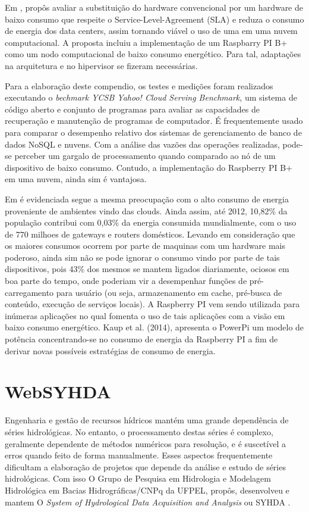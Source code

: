 \documentclass[12pt,english,brazil]{article}
\begin{document}
Em \cite{Joao}, propôs avaliar a substituição do hardware convencional por um hardware de baixo consumo que respeite o Service-Level-Agreement (SLA) e reduza o consumo de energia dos data centers, assim tornando viável o uso de uma em uma nuvem computacional. A proposta incluiu a implementação de um Raspbarry PI B+ como um nodo computacional de baixo consumo energético. Para tal, adaptações na arquitetura e no hipervisor  se fizeram necessárias.

Para a elaboração deste compendio, os testes e medições foram realizados executando o \emph{bechmark YCSB Yahoo! Cloud Serving Benchmark}, um sistema de código aberto e conjunto de programas para avaliar as capacidades de recuperação e manutenção de programas de computador. É frequentemente usado para comparar o desempenho relativo dos sistemas de gerenciamento de banco de dados NoSQL e nuvens. Com a análise das vazões das operações realizadas, pode-se perceber um gargalo de processamento quando comparado ao nó de um dispositivo de baixo consumo. Contudo, a implementação do Raspberry PI B+ em uma nuvem, ainda sim é vantajosa.

Em \cite{PiConsumo} é evidenciada segue a mesma preocupação com o alto consumo de energia proveniente de ambientes vindo das clouds. Ainda assim, até 2012, 10,82\% da população contribui com 0,03\% da energia consumida mundialmente, com o uso de 770 milhoes de gateways e routers domésticos. Levando em consideração que os maiores consumos ocorrem por parte de maquinas com um hardware mais poderoso, ainda sim não se pode ignorar o consumo vindo por parte de tais dispositivos, pois 43\% dos mesmos se mantem ligados diariamente, ociosos em boa parte do tempo, onde poderiam vir a desempenhar funções de pré-carregamento para usuário (ou seja, armazenamento em cache, pré-busca de conteúdo, execução de serviços locais). A Raspberry PI vem sendo utilizada para inúmeras aplicações no qual fomenta o uso de tais aplicações com a visão em baixo consumo energético. Kaup et al. (2014), apresenta o PowerPi um modelo de  potência concentrando-se no consumo de energia da Raspberry PI a fim de derivar novas possíveis estratégias de consumo de energia.



\section{WebSYHDA}\label{sec:WebSYHDA}

Engenharia e gestão de recursos hídricos mantém uma grande dependência de séries hidrológicas. No entanto, o processamento destas séries é complexo, geralmente dependente de métodos numéricos para resolução, e é suscetível a erros quando feito de forma manualmente. Esses aspectos frequentemente dificultam a elaboração de projetos que depende da análise e estudo de séries hidrológicas. Com isso O Grupo de Pesquisa em Hidrologia e Modelagem Hidrológica em Bacias Hidrográficas/CNPq da UFPEL, propôs, desenvolveu e mantem O \emph{System of Hydrological Data Acquisition and Analysis} ou SYHDA \cite{syhda}.
\end{document}
